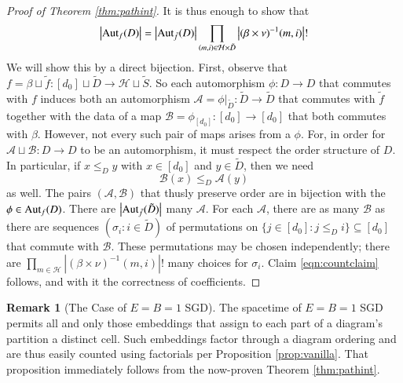 \documentclass[openany, notitlepage, justified]{tufte-book}
\theoremstyle{plain}
\theoremstyle{definition}
\newtheorem{rmk}{Remark}
\newcommand{\wabs}[1]{\left|#1\right|}
\newcommand{\Aut}{\text{\textnormal{Aut}}}
\newcommand{\Aa}{\mathcal{A}}
\newcommand{\Bb}{\mathcal{B}}
\newcommand{\Hh}{\mathcal{H}}
\begin{document}
\begin{proof}[Proof of Theorem \ref{thm:pathint}]
            It is thus enough to show that
            \begin{align} \label{eqn:countclaim}
                \wabs{\Aut_f(D)} = 
                \wabs{\Aut_{\tilde f}(D)}
                \prod_{(m, i) \in \Hh \times \tilde D}
                    \wabs{(\beta \times \nu)^{-1}(m, i)}!
            \end{align}
            We will show this by a direct bijection.  First, observe that
            $
                f = \beta \sqcup \tilde f:
                    [d_0] \sqcup \tilde D \to \Hh \sqcup \tilde S
            $. 
            So each automorphism $\phi: D\to D$ that commutes with $f$ induces
            both an automorphism
            $
                \Aa = \phi|_{\tilde D}: \tilde D\to \tilde D
            $
            that commutes with $\tilde f$ together with the data of a map
            $
                \Bb = \phi_{[d_0]}: [d_0] \to [d_0] 
            $
            that both commutes with $\beta$.  However, not every such pair of
            maps arises from a $\phi$.  For, in order for $\Aa \sqcup \Bb: D
            \to D$ to be an automorphism, it must respect the order structure
            of $D$.  In particular, if $x\leq_D y$ with $x \in [d_0]$ and $y
            \in \tilde D$, then we need
            $$
                \Bb(x) \leq_D \Aa(y)
            $$
            as well.  The
            pairs $(\Aa, \Bb)$ that thusly preserve order are in bijection with
            the $\phi \in \Aut_f(D)$.  There are $\wabs{\Aut_{\tilde f}(\tilde
            D)}$ many $\Aa$.  For each $\Aa$, there are as many $\Bb$ as there
            are sequences $(\sigma_i: i \in \tilde D)$ of permutations on
            $
                \{j\in [d_0]: j\leq_D i\} \subseteq [d_0]
            $ 
            that commute with $\Bb$.  These permutations may be chosen
            independently; there are 
            $
                \prod_{m\in \Hh}
                    \wabs{(\beta \times \nu)^{-1}(m, i)}!
            $
            many choices for $\sigma_i$.  Claim \ref{eqn:countclaim}
            follows, and with it the correctness of coefficients.
        \end{proof}

        \begin{rmk}[The Case of $E=B=1$ SGD]
            The spacetime of $E=B=1$ SGD permits all and only those
            embeddings that assign to each part of a diagram's partition  a
            distinct cell.  Such embeddings factor through a diagram
            ordering and are thus easily counted using factorials per
            Proposition \ref{prop:vanilla}.  That proposition immediately
            follows from the now-proven Theorem \ref{thm:pathint}.
        \end{rmk}
\end{document}
